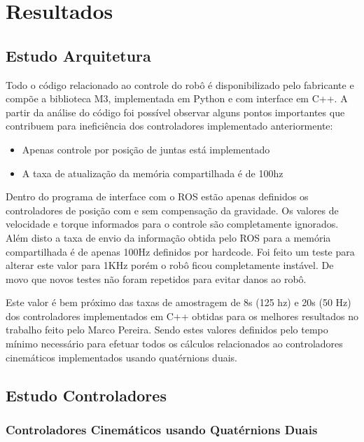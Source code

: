 \chapter{Resultados\label{ch:results}}


\section{Estudo Arquitetura}

Todo o código relacionado ao controle do robô é disponibilizado pelo fabricante e compõe a biblioteca M3, implementada em Python e com interface em C++. A partir da análise do código foi possível observar alguns pontos importantes que contribuem para ineficiência dos controladores implementado anteriormente:

\begin{itemize}
    \item Apenas controle por posição de juntas está implementado
    \item A taxa de atualização da memória compartilhada é de 100hz
\end{itemize}

Dentro do programa de interface com o ROS estão apenas definidos os controladores de posição com e sem compensação da gravidade. Os valores de velocidade e torque informados para o controle são completamente ignorados. Além disto a taxa de envio da informação obtida pelo ROS para a memória compartilhada é de apenas 100Hz definidos por hardcode. Foi feito um teste para alterar este valor para 1KHz porém o robô ficou completamente instável. De movo que novos testes não foram repetidos para evitar danos ao robô.

Este valor é bem próximo das taxas de amostragem de 8s (125 hz) e 20s (50 Hz) dos controladores implementados em C++ obtidas para os melhores resultados no trabalho feito pelo Marco Pereira. Sendo estes valores definidos pelo tempo mínimo necessário para efetuar todos os cálculos relacionados ao controladores cinemáticos implementados usando quatérnions duais.

\section{Estudo Controladores}

\subsection{Controladores Cinemáticos usando Quatérnions Duais}

